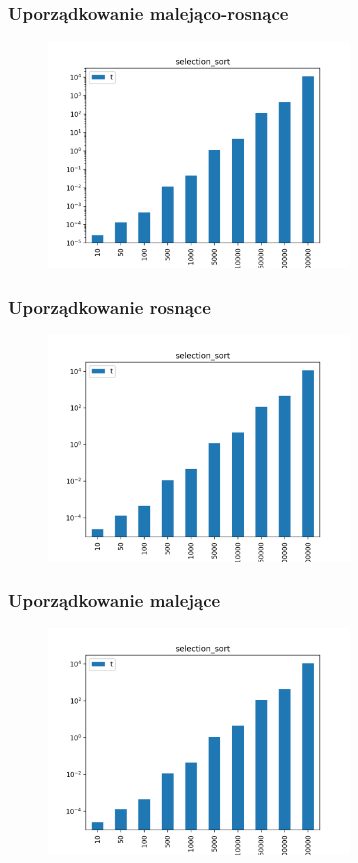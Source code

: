 \documentclass[]{article}
\begin{document}
		\subsubsection{Uporządkowanie malejąco-rosnące}
			\begin{figure}[H]
				\centering
				\includegraphics[width=8cm]{selection_sort_v.png}	
			\end{figure}
		\subsubsection{Uporządkowanie rosnące}
			\begin{figure}[H]
				\centering
				\includegraphics[width=8cm]{selection_sort_g.png}	
			\end{figure}
		\subsubsection{Uporządkowanie malejące}
			\begin{figure}[H]
				\centering
				\includegraphics[width=8cm]{selection_sort_l.png}	
			\end{figure}
\end{document}

